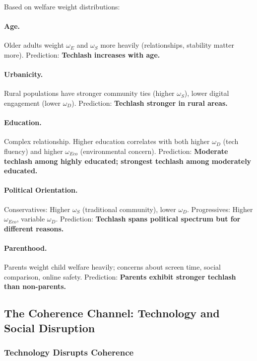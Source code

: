 Based on welfare weight distributions:

\paragraph{Age.}
Older adults weight $\omega_E$ and $\omega_S$ more heavily (relationships, stability matter more).
Prediction: \textbf{Techlash increases with age.}

\paragraph{Urbanicity.}
Rural populations have stronger community ties (higher $\omega_S$), lower digital engagement (lower $\omega_D$).
Prediction: \textbf{Techlash stronger in rural areas.}

\paragraph{Education.}
Complex relationship. Higher education correlates with both higher $\omega_D$ (tech fluency) 
and higher $\omega_{Eco}$ (environmental concern).
Prediction: \textbf{Moderate techlash among highly educated; strongest techlash among moderately educated.}

\paragraph{Political Orientation.}
Conservatives: Higher $\omega_S$ (traditional community), lower $\omega_D$.
Progressives: Higher $\omega_{Eco}$, variable $\omega_D$.
Prediction: \textbf{Techlash spans political spectrum but for different reasons.}

\paragraph{Parenthood.}
Parents weight child welfare heavily; concerns about screen time, social comparison, online safety.
Prediction: \textbf{Parents exhibit stronger techlash than non-parents.}

\subsection{The Coherence Channel: Technology and Social Disruption}

\subsubsection{Technology Disrupts Coherence}

